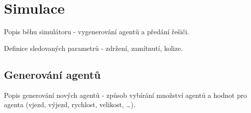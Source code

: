 \section{Simulace}\label{sec:simulace}

Popis běhu simulátoru - vygenerování agentů a předání řešiči.

Definice sledovaných parametrů - zdržení, zamítnutí, kolize.

%
%
%

\subsection{Generování agentů}\label{subsec:generovani_agentu}

Popis generování nových agentů - způsob vybírání množství agentů a
hodnot pro agenta (vjezd, výjezd, rychlost, velikost, \ldots).

